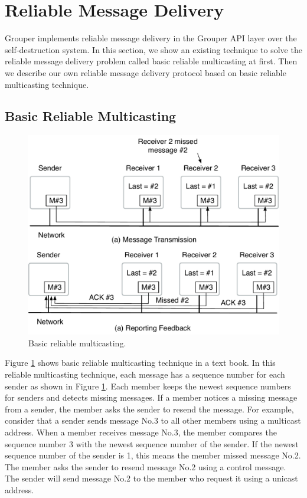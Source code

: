 \documentclass[a4paper,11pt]{report}
\begin{document}
\section{Reliable Message Delivery}  \label{section:reliable_message_delivery}

Grouper implements reliable message delivery in the Grouper API layer over the self-destruction system.
In this section, we show an existing technique to solve the reliable message delivery problem called basic reliable multicasting at first.
Then we describe our own reliable message delivery protocol based on basic reliable multicasting technique.

\subsection{Basic Reliable Multicasting}

\begin{figure}[t]
	\centering
	\includegraphics[scale=0.6]{reliable_multicasting}
	\caption{Basic reliable multicasting.}
	\label{fig:reliable_multicasting}
\end{figure}

Figure \ref{fig:reliable_multicasting} shows basic reliable multicasting technique in a text book\cite{tanenbaum2007distributed}.
In this reliable multicasting technique, each message has a sequence number for each sender as shown in Figure \ref{fig:reliable_multicasting}.
Each member keeps the newest sequence numbers for senders and detects missing messages.
If a member notices a missing message from a sender, the member asks the sender to resend the message.
For example, consider that a sender sends message No.3 to all other members using a multicast address.
When a member receives message No.3, the member compares the sequence number 3 with the newest sequence number of the sender.
If the newest sequence number of the sender is 1, this means the member missed message No.2.
The member asks the sender to resend message No.2 using a control message.
The sender will send message No.2 to the member who request it using a unicast address.
\end{document}
